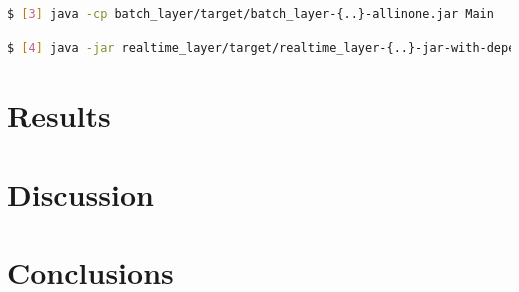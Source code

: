 \documentclass{lmproj}
\begin{document}
\begin{lstlisting}[language=bash]
$ [3] java -cp batch_layer/target/batch_layer-{..}-allinone.jar Main
\end{lstlisting}

\begin{lstlisting}[language=bash]
$ [4] java -jar realtime_layer/target/realtime_layer-{..}-jar-with-dependencies.jar
\end{lstlisting}

\section{Results}
\label{evaluation}

\section{Discussion}
\label{evaluation}


\section{Conclusions}
\label{conclusions}




\end{document}
